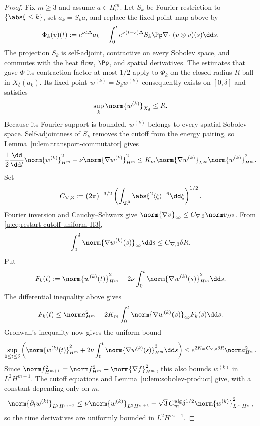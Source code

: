 \begin{proof}
Fix \(m\ge3\) and assume \(a\in H^m_\sigma\).  Let \(S_k\) be Fourier
restriction to \(\{\abs\xi\le k\}\), set \(a_k=S_ka\), and replace the
fixed-point map above by
\[
 \Phi_k(v)(t):=e^{\nu t\Delta}a_k
 -\int_0^te^{\nu(t-s)\Delta}S_k\Pp\nabla\!\cdot
   (v\otimes v)(s)\dd s.
\]
The projection \(S_k\) is self-adjoint, contractive on every Sobolev space,
and commutes with the heat flow, \(\Pp\), and spatial derivatives.  The estimates that gave \(\Phi\) its contraction factor at most \(1/2\) apply to
\(\Phi_k\) on the closed radius-\(R\) ball in \(X_\delta(a_k)\).  Its fixed point
\(w^{(k)}=S_kw^{(k)}\) consequently exists on \([0,\delta]\) and satisfies
\begin{equation}
 \sup_k\norm{w^{(k)}}_{X_\delta}\le R.
 \label{u:eq:restart-cutoff-uniform-H3}
\end{equation}
Because its Fourier support is bounded, \(w^{(k)}\) belongs to every spatial
Sobolev space.  Self-adjointness of \(S_k\) removes the cutoff from the energy
pairing, so Lemma~\ref{u:lem:transport-commutator} gives
\[
 \frac12\frac{\dd}{\dd t}\norm{w^{(k)}}_{H^m}^2
 +\nu\norm{\nabla w^{(k)}}_{H^m}^2
 \le K_m\norm{\nabla w^{(k)}}_{L^\infty}
       \norm{w^{(k)}}_{H^m}^2.
\]
Set
\[
 C_{\nabla,3}:=(2\pi)^{-3/2}
 \left(\int_{\R^3}\abs\xi^2\langle\xi\rangle^{-6}\dd\xi\right)^{1/2}.
\]
Fourier inversion and Cauchy--Schwarz give
\(\norm{\nabla v}_\infty\le C_{\nabla,3}\norm v_{H^3}\).  From
\eqref{u:eq:restart-cutoff-uniform-H3},
\[
 \int_0^\delta\norm{\nabla w^{(k)}(s)}_\infty\dd s
 \le C_{\nabla,3}\delta R.
\]
Put
\[
 F_k(t):=\norm{w^{(k)}(t)}_{H^m}^2
 {}+2\nu\int_0^t\norm{\nabla w^{(k)}(s)}_{H^m}^2\dd s.
\]
The differential inequality above gives
\[
 F_k(t)\le\norm a_{H^m}^2
 {}+2K_m\int_0^t\norm{\nabla w^{(k)}(s)}_\infty F_k(s)\dd s.
\]
Gronwall's inequality now gives the uniform bound
\begin{equation}
 \sup_{0\le t\le\delta}\left(
 \norm{w^{(k)}(t)}_{H^m}^2
{}+2\nu\int_0^t\norm{\nabla w^{(k)}(s)}_{H^m}^2\dd s
 \right)
 \le e^{2K_mC_{\nabla,3}\delta R}\norm a_{H^m}^2.
 \label{u:eq:restart-cutoff-uniform-Hm}
\end{equation}
Since
\(
 \norm f_{H^{m+1}}^2=\norm f_{H^m}^2+\norm{\nabla f}_{H^m}^2
\), this also bounds \(w^{(k)}\) in \(L^2H^{m+1}\).  The cutoff equations
and Lemma~\ref{u:lem:sobolev-product} give, with a constant depending only on
\(m\),
\[
 \norm{\partial_tw^{(k)}}_{L^2H^{m-1}}
 \le \nu\norm{w^{(k)}}_{L^2H^{m+1}}
 +\sqrt3\,C_m^{\rm alg}\delta^{1/2}
   \norm{w^{(k)}}_{L^\infty H^m}^2,
\]
so the time derivatives are uniformly bounded in \(L^2H^{m-1}\).


\end{proof}
